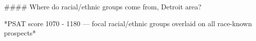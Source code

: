#### Where do racial/ethnic groups come from, Detroit area?

*PSAT score 1070 - 1180 — focal racial/ethnic groups overlaid on all race-known prospects*
